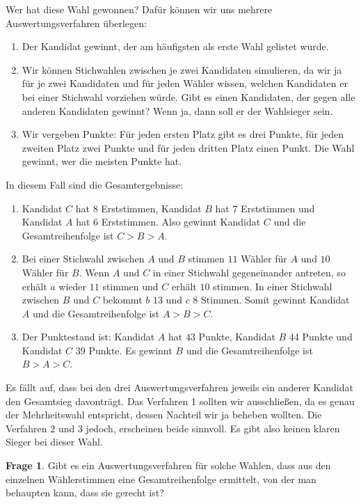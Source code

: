 \documentclass[a4paper,ngerman,12pt]{scrartcl}
\theoremstyle{definition}
\newtheorem*{frage}{Frage}
\begin{document}
Wer hat diese Wahl gewonnen? Dafür können wir uns mehrere Auswertungsverfahren überlegen:

\begin{enumerate}
  \item Der Kandidat gewinnt, der am häufigsten als erste Wahl gelistet wurde.
  \item Wir können Stichwahlen zwischen je zwei Kandidaten simulieren, da wir ja für je zwei Kandidaten und für jeden Wähler wissen, welchen Kandidaten er bei einer Stichwahl vorziehen würde. Gibt es einen Kandidaten, der gegen alle anderen Kandidaten gewinnt? Wenn ja, dann soll er der Wahlsieger sein.
  \item Wir vergeben Punkte: Für jeden ersten Platz gibt es drei Punkte, für jeden zweiten Platz zwei Punkte und für jeden dritten Platz einen Punkt. Die Wahl gewinnt, wer die meisten Punkte hat.
\end{enumerate}

In diesem Fall sind die Gesamtergebnisse:

\begin{enumerate}
  \item Kandidat $C$ hat $8$ Erststimmen, Kandidat $B$ hat $7$ Erststimmen und Kandidat $A$ hat $6$ Erststimmen. Also gewinnt Kandidat $C$ und die Gesamtreihenfolge ist $C > B > A$.
  \item Bei einer Stichwahl zwischen $A$ und $B$ stimmen $11$ Wähler für $A$ und $10$ Wähler für $B$. Wenn $A$ und $C$ in einer Stichwahl gegeneinander antreten, so erhält $a$ wieder $11$ stimmen und $C$ erhält $10$ stimmen. In einer Stichwahl zwischen $B$ und $C$ bekommt $b$ $13$ und $c$ $8$ Stimmen. Somit gewinnt Kandidat $A$ und die Gesamtreihenfolge ist $A > B > C$. 
  \item Der Punktestand ist: Kandidat $A$ hat $43$ Punkte, Kandidat $B$ $44$ Punkte und Kandidat $C$ $39$ Punkte. Es gewinnt $B$ und die Gesamtreihenfolge ist $B > A > C$.
\end{enumerate}

Es fällt auf, dass bei den drei Auswertungsverfahren jeweils ein anderer Kandidat den Gesamtsieg davonträgt. Das Verfahren 1 sollten wir ausschließen, da es genau der Mehrheitswahl entspricht, dessen Nachteil wir ja beheben wollten. Die Verfahren $2$ und $3$ jedoch, erscheinen beide sinnvoll. Es gibt also keinen klaren Sieger bei dieser Wahl.

\begin{frage}
  Gibt es ein Auswertungsverfahren für solche Wahlen, dass aus den einzelnen Wählerstimmen eine Gesamtreihenfolge ermittelt, von der man behaupten kann, dass sie gerecht ist?
\end{frage}
\end{document}
